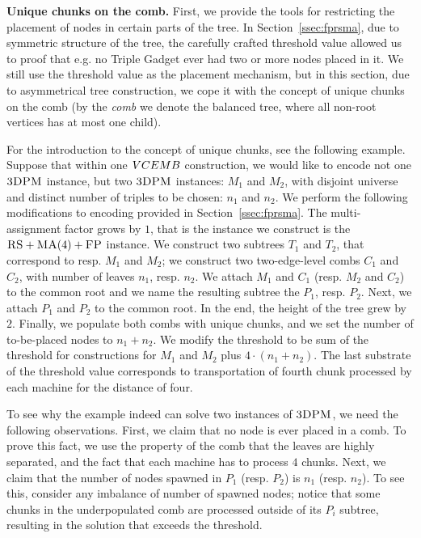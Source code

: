 \textbf{Unique chunks on the comb.} First, we provide the tools for restricting the placement of nodes in certain parts of the tree.
In Section~\ref{ssec:fprsma}, due to symmetric structure of the tree, the carefully crafted threshold value allowed us to proof that e.g. no Triple Gadget ever had two or more nodes placed in it.
We still use the threshold value as the placement mechanism, but in this section, due to asymmetrical tree construction, we cope it with the concept of unique chunks on the comb (by the \emph{comb} we denote the balanced tree, where all non-root vertices has at most one child).

For the introduction to the concept of unique chunks, see the following example.
Suppose that within one $VCEMB$ construction, we would like to encode not one $\textsc{3DPM}$ instance, but two $\textsc{3DPM}$ instances: $M_1$ and $M_2$, with disjoint universe and distinct number of triples to be chosen: $n_1$ and $n_2$.
We perform the following modifications to encoding provided in Section~\ref{ssec:fprsma}.
The multi-assignment factor grows by $1$, that is the instance we construct is the $\textsc{RS}+\textsc{MA}(4)+\textsc{FP}$ instance.
We construct two subtrees $T_1$ and $T_2$, that correspond to resp. $M_1$ and $M_2$; we construct two two-edge-level combs $C_1$ and $C_2$, with number of leaves $n_1$, resp. $n_2$.
We attach $M_1$ and $C_1$ (resp. $M_2$ and $C_2$) to the common root and we name the resulting subtree the $P_1$, resp. $P_2$.
Next, we attach $P_1$ and $P_2$ to the common root.
In the end, the height of the tree grew by $2$.
Finally, we populate both combs with unique chunks, and we set the number of to-be-placed nodes to $n_1+n_2$.
We modify the threshold to be sum of the threshold for constructions for $M_1$ and $M_2$ plus $4\cdot (n_1 + n_2)$.
The last substrate of the threshold value corresponds to transportation of fourth chunk processed by each machine for the distance of four.

To see why the example indeed can solve two instances of $\textsc{3DPM}$, we need the following observations.
First, we claim that no node is ever placed in a comb.
To prove this fact, we use the property of the comb that the leaves are highly separated, and the fact that each machine has to process $4$ chunks.
Next, we claim that the number of nodes spawned in $P_1$ (resp. $P_2$) is $n_1$ (resp. $n_2$).
To see this, consider any imbalance of number of spawned nodes; notice that some chunks in the underpopulated comb are processed outside of its $P_i$ subtree, resulting in the solution that exceeds the threshold.

